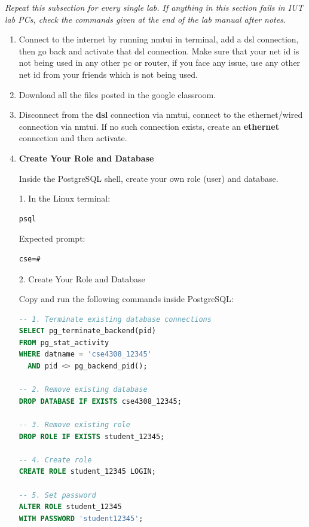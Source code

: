 \documentclass[12pt,a4paper]{article}
\begin{document}

\textit{Repeat this subsection for every single lab. If anything in this section fails in IUT lab PCs, check the commands given at the end of the lab manual after notes.}

\begin{enumerate}
\item Connect to the internet by running nmtui in terminal, add a dsl connection, then go back and activate that dsl connection. Make sure that your net id is not being used in any other pc or router, if you face any issue, use any other net id from your friends which is not being used.

\item Download all the files posted in the google classroom.

\item Disconnect from the \textbf{dsl} connection via nmtui, connect to the ethernet/wired connection via nmtui. If no such connection exists, create an \textbf{ethernet} connection  and then activate.

    \item \textbf{Create Your Role and Database}

Inside the PostgreSQL shell, create your own role (user) and database.

1. In the Linux terminal:
\begin{lstlisting}[language=bash]
psql
\end{lstlisting}

Expected prompt:
\begin{lstlisting}
cse=#
\end{lstlisting}

2. Create Your Role and Database

Copy and run the following commands inside PostgreSQL:
\begin{lstlisting}[language=SQL]
-- 1. Terminate existing database connections
SELECT pg_terminate_backend(pid)
FROM pg_stat_activity
WHERE datname = 'cse4308_12345'
  AND pid <> pg_backend_pid();

-- 2. Remove existing database
DROP DATABASE IF EXISTS cse4308_12345;

-- 3. Remove existing role
DROP ROLE IF EXISTS student_12345;

-- 4. Create role
CREATE ROLE student_12345 LOGIN;

-- 5. Set password
ALTER ROLE student_12345
WITH PASSWORD 'student12345';


\end{lstlisting}
\end{enumerate}
\end{document}
